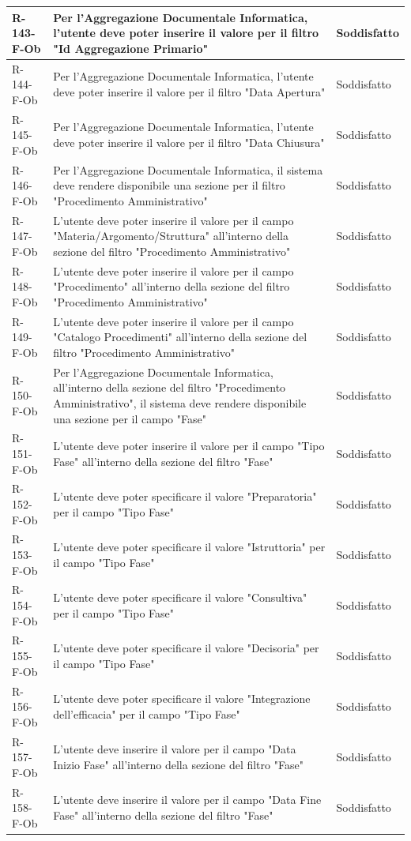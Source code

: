 \begin{longtable}{|p{2.5cm}|p{9.5cm}|p{2.5cm}|}
\hline
R-143-F-Ob & Per l'Aggregazione Documentale Informatica, l'utente deve poter inserire il valore per il filtro "Id Aggregazione Primario" & Soddisfatto \\
\hline
R-144-F-Ob & Per l'Aggregazione Documentale Informatica, l'utente deve poter inserire il valore per il filtro "Data Apertura" & Soddisfatto \\
\hline
R-145-F-Ob & Per l'Aggregazione Documentale Informatica, l'utente deve poter inserire il valore per il filtro "Data Chiusura" & Soddisfatto \\
\hline
R-146-F-Ob & Per l'Aggregazione Documentale Informatica, il sistema deve rendere disponibile una sezione per il filtro "Procedimento Amministrativo" & Soddisfatto \\
\hline
R-147-F-Ob & L'utente deve poter inserire il valore per il campo "Materia/Argomento/Struttura" all'interno della sezione del filtro "Procedimento Amministrativo" & Soddisfatto \\
\hline
R-148-F-Ob & L'utente deve poter inserire il valore per il campo "Procedimento" all'interno della sezione del filtro "Procedimento Amministrativo" & Soddisfatto \\
\hline
R-149-F-Ob & L'utente deve poter inserire il valore per il campo "Catalogo Procedimenti" all'interno della sezione del filtro "Procedimento Amministrativo" & Soddisfatto \\
\hline


R-150-F-Ob & Per l'Aggregazione Documentale Informatica, all'interno della sezione del filtro "Procedimento Amministrativo", il sistema deve rendere disponibile una sezione per il campo "Fase" & Soddisfatto \\
\hline
R-151-F-Ob & L'utente deve poter inserire il valore per il campo "Tipo Fase" all'interno della sezione del filtro "Fase" & Soddisfatto \\
\hline
R-152-F-Ob & L'utente deve poter specificare il valore "Preparatoria" per il campo "Tipo Fase" & Soddisfatto \\
\hline
R-153-F-Ob & L'utente deve poter specificare il valore "Istruttoria" per il campo "Tipo Fase" & Soddisfatto \\
\hline
R-154-F-Ob & L'utente deve poter specificare il valore "Consultiva" per il campo "Tipo Fase" & Soddisfatto \\
\hline
R-155-F-Ob & L'utente deve poter specificare il valore "Decisoria" per il campo "Tipo Fase" & Soddisfatto \\
\hline
R-156-F-Ob & L'utente deve poter specificare il valore "Integrazione dell'efficacia" per il campo "Tipo Fase" & Soddisfatto \\
\hline
R-157-F-Ob & L'utente deve inserire il valore per il campo "Data Inizio Fase" all'interno della sezione del filtro "Fase" & Soddisfatto \\
\hline
R-158-F-Ob & L'utente deve inserire il valore per il campo "Data Fine Fase" all'interno della sezione del filtro "Fase" & Soddisfatto \\



\end{longtable}

